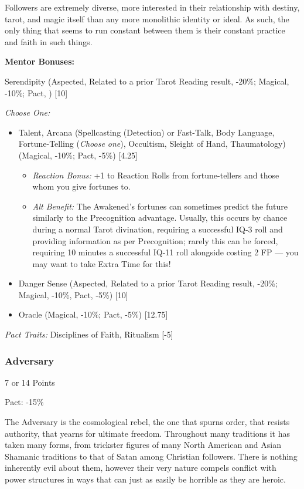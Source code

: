 \begin{multicols}{3}
	Followers are extremely diverse, more interested in their relationship with destiny, tarot, and magic itself than any more monolithic identity or ideal. As such, the only thing that seems to run constant between them is their constant practice and faith in such things.
	
	\textbf{Mentor Bonuses:} 
	
	Serendipity (Aspected, Related to a prior Tarot Reading result, -20\%; Magical, -10\%; Pact, ) [10]
	
	\textit{Choose One:}
	\begin{itemize}
		\itemsep 0pt
		\item Talent, Arcana (Spellcasting (Detection) or Fast-Talk, Body Language, Fortune-Telling (\textit{Choose one}), Occultism, Sleight of Hand, Thaumatology) (Magical, -10\%; Pact, -5\%) [4.25]
		\begin{itemize}
			\itemsep 0pt
			\item \textit{Reaction Bonus:} +1 to Reaction Rolls from fortune-tellers and those whom you give fortunes to.
			\item \textit{Alt Benefit:} The Awakened's fortunes can sometimes predict the future similarly to the Precognition advantage. Usually, this occurs by chance during a normal Tarot divination, requiring a successful IQ-3 roll and providing information as per Precognition; rarely this can be forced, requiring 10 minutes a successful IQ-11 roll alongside costing 2 FP — you may want to take Extra Time for this!
		\end{itemize}
		\item Danger Sense (Aspected, Related to a prior Tarot Reading result, -20\%; Magical, -10\%, Pact, -5\%) [10]
		\item Oracle (Magical, -10\%; Pact, -5\%) [12.75]
	\end{itemize}
	
	\textit{Pact Traits:} Disciplines of Faith, Ritualism [-5]
	
	\subsubsection{Adversary}
	\begin{flushright}
		7 or 14 Points
	\end{flushright}
	Pact: -15\%
	
	The Adversary is the cosmological rebel, the one that spurns order, that resists authority, that yearns for ultimate freedom. Throughout many traditions it has taken many forms, from trickster figures of many North American and Asian Shamanic traditions to that of Satan among Christian followers. There is nothing inherently evil about them, however their very nature compels conflict with power structures in ways that can just as easily be horrible as they are heroic.
	

\end{multicols}
